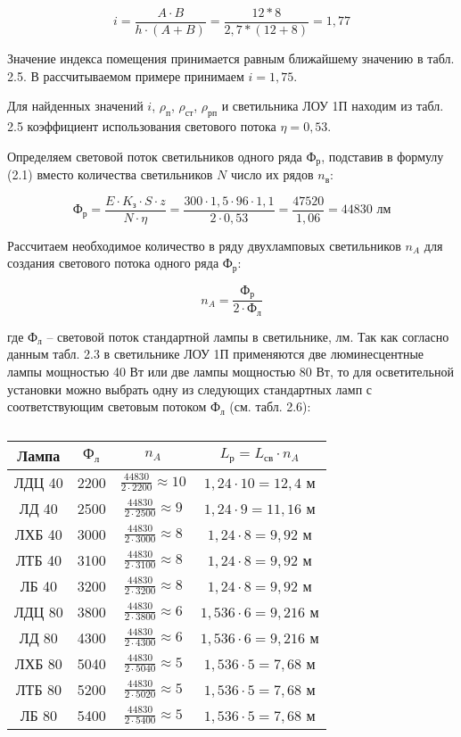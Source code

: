 \[
i=\frac{A \cdot B}{h \cdot (A+B)}=\frac{12*8}{2,7*(12+8)}=1,77
\]

Значение индекса помещения принимается равным ближайшему значению в табл. 2.5. В рассчитываемом примере принимаем $i = 1,75$.

Для найденных значений $i$, $\rho_\text{п}$, $\rho_\text{ст}$, $\rho_\text{рп}$ и светильника ЛОУ 1П находим из табл. 2.5 коэффициент использования светового потока $\eta = 0,53$.

Определяем световой поток светильников одного ряда $\text{Ф}_\text{р}$, подставив в формулу (2.1) вместо количества светильников $N$ число их рядов $n_\text{в}$:

\[
\text{Ф}_\text{р} = \frac{E \cdot K_\text{з} \cdot S \cdot z}{N \cdot \eta} = \frac{300 \cdot 1,5 \cdot 96 \cdot 1,1 }{2 \cdot 0,53} = \frac{47520}{1,06}=44830 \text{ лм}
\]

Рассчитаем необходимое количество в ряду двухламповых светильников $n_A$ для создания светового потока одного ряда $\text{Ф}_\text{р}$:

\[
n_A = \frac{\text{Ф}_\text{р}}{2 \cdot \text{Ф}_\text{л}}
\]

где $\text{Ф}_\text{л}$ – световой поток стандартной лампы в светильнике, лм.
Так как согласно данным табл. 2.3 в светильнике ЛОУ 1П применяются две люминесцентные лампы мощностью 40 Вт или две лампы мощностью 80 Вт, то для осветительной установки можно выбрать одну из следующих стандартных ламп с соответствующим световым потоком $\text{Ф}_\text{л}$ (см. табл. 2.6):

\begin{table}
	\caption{}
	\centering
	\begin{tabular}{|c|c|c|c|}
		\hline
		Лампа & $\text{Ф}_\text{л}$ & $n_A$ & $L_\text{р} = L_\text{св} \cdot n_A$ \\ \hline
		ЛДЦ 40 & 2200 & $\frac{44830}{2 \cdot 2200} \approx 10$ & $1,24 \cdot 10 = 12,4$ м \\ \hline
		ЛД 40 & 2500  & $\frac{44830}{2 \cdot 2500} \approx 9$ & $1,24 \cdot 9 = 11,16$ м \\ \hline
		ЛХБ 40 & 3000  & $\frac{44830}{2 \cdot 3000} \approx 8$ & $1,24 \cdot 8 = 9,92$ м \\ \hline
		ЛТБ 40 & 3100  & $\frac{44830}{2 \cdot 3100} \approx 8$ & $1,24 \cdot 8 = 9,92$ м \\ \hline
		ЛБ 40 & 3200  & $\frac{44830}{2 \cdot 3200} \approx 8$ & $1,24 \cdot 8 = 9,92$ м \\ \hline
		ЛДЦ 80 & 3800  & $\frac{44830}{2 \cdot 3800} \approx 6$ & $1,536 \cdot 6 = 9,216$ м \\ \hline
		ЛД 80 & 4300  & $\frac{44830}{2 \cdot 4300} \approx 6$ & $1,536 \cdot 6 = 9,216$ м \\ \hline
		ЛХБ 80 & 5040  & $\frac{44830}{2 \cdot 5040} \approx 5$ & $1,536 \cdot 5 = 7,68$ м \\ \hline
		ЛТБ 80 & 5200  & $\frac{44830}{2 \cdot 5020} \approx 5$ & $1,536 \cdot 5 = 7,68$ м \\ \hline
		ЛБ 80 & 5400  & $\frac{44830}{2 \cdot 5400} \approx 5$ & $1,536 \cdot 5 = 7,68$ м \\ \hline
	\end{tabular}
\end{table}

